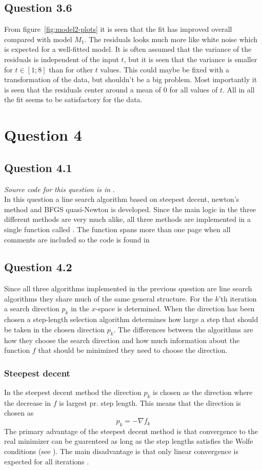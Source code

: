 \subsection*{Question 3.6}
From figure~\ref{fig:model2-plots} it is seen that the fit has improved overall compared with model $M_1$. The residuals looks much more like white noise which is expected for a well-fitted model. It is often assumed that the variance of the residuals is independent of the input $t$, but it is seen that the variance is smaller for $t\in[1;8]$ than for other $t$ values. This could maybe be fixed with a transformation of the data, but shouldn't be a big problem. Most importantly it is seen that the residuals center around a mean of 0 for all values of $t$. All in all the fit seems to be satisfactory for the data.

\section*{Question 4}

\subsection*{Question 4.1}
\textit{Source code for this question is in }. \\
In this question a line search algorithm based on steepest decent, newton's method and BFGS quasi-Newton is developed. Since the main logic in the three different methods are very much alike, all three methods are implemented in a single function called . The function spans more than one page when all comments are included so the code is found in 

\subsection*{Question 4.2}
Since all three algorithms implemented in the previous question are line search algorithms they share much of the same general structure. For the $k$'th iteration a search direction $p_k$ in the $x$-space is determined. When the direction has been chosen a step-length selection algorithm determines how large a step that should be taken in the chosen direction $p_k$. The differences between the algorithms are how they choose the search direction and how much information about the function $f$ that should be minimized they need to choose the direction.
\subsubsection*{Steepest decent}
In the steepest decent method the direction $p_k$ is chosen as the direction where the decrease in $f$ is largest pr. step length. This means that the direction is chosen as
\begin{equation*}
    p_k = -\nabla f_k
\end{equation*}
The primary advantage of the steepest decent method is that convergence to the real minimizer can be guarenteed as long as the step lengths satisfies the Wolfe conditions (see \cite[p.38-40]{nocedal06}). The main disadvantage is that only linear convergence is expected for all iterations \cite[p.29]{nielsen10}.

